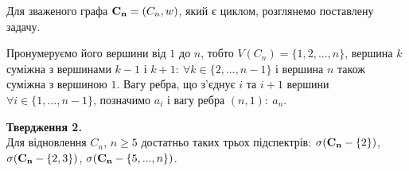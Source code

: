 Для зваженого графа ${\bf C_n} = (C_n,w)$, який є циклом, розглянемо поставлену задачу.

Пронумеруємо його вершини від $1$ до $n$, тобто $ V(C_n) = \{ 1,2,...,n\} $, вершина $k$ суміжна з вершинами $k-1$ і $k+1:\ \forall k \in \{2,...,n-1\}$ і вершина $n$ також суміжна з вершиною $1$. Вагу ребра, що з'єднує $i$ та $i+1$ вершини $\forall i \in \{1,...,n-1\}$, позначимо $a_i$ і вагу ребра $(n,1):\ a_n$.

\textbf{Твердження 2.}\\
Для відновлення $C_n$, $n\geq 5$ достатньо таких трьох підспектрів: $\sigma({\bf C_n}-\{2\})$, $\sigma({\bf C_n}-\{2,3\})$,  $\sigma({\bf C_n}-\{5,...,n\})$.